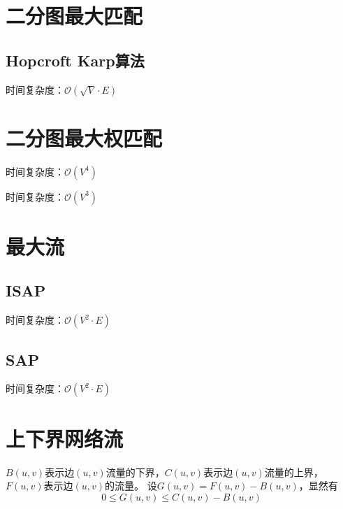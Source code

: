 \documentclass[landscape, oneside, a4paper, cs4size]{book}
\begin{document}
\begin{multicols}{2}
			\section{二分图最大匹配}
			\begin{spacing}{0.8}
				\subsection{Hopcroft Karp算法}
					时间复杂度：$\mathcal{O}(\sqrt{V} \cdot E)$
					
			\end{spacing}
			\section{二分图最大权匹配}
			\begin{spacing}{0.8}
				时间复杂度：$\mathcal{O}(V^4)$
				
			\end{spacing}
			\begin{spacing}{0.8}
				时间复杂度：$\mathcal{O}(V^3)$
				
			\end{spacing}
			\section{最大流}
			\begin{spacing}{0.8}
				\subsection{ISAP}
					\indent 时间复杂度：$\mathcal{O}(V^2 \cdot E)$
					
				\subsection{SAP}
					\indent 时间复杂度：$\mathcal{O}(V^2 \cdot E)$
					
			\end{spacing}
			\section{上下界网络流}
			\begin{spacing}{0.8}
				$B(u,v)$表示边$(u,v)$流量的下界，$C(u,v)$表示边$(u,v)$流量的上界，$F(u,v)$表示边$(u,v)$的流量。
				设$G(u,v) = F(u,v) - B(u,v)$，显然有
				$$0 \leq G(u,v) \leq C(u,v)-B(u,v)$$
			\end{spacing}

\end{multicols}
\end{document}
